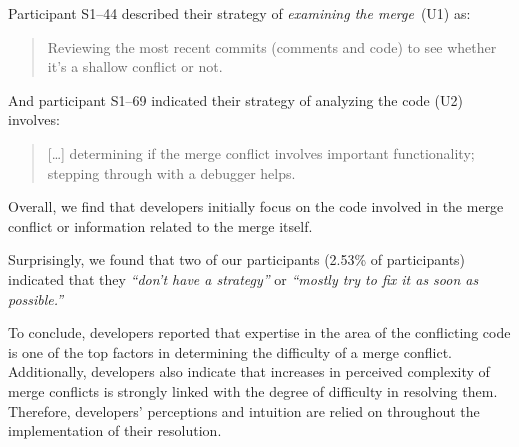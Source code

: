 Participant S1--44 described their strategy of \textit{examining the merge}~(U1) as:
\begin{quotation}
	Reviewing the most recent commits (comments and code) to see whether it's a shallow conflict or not.
\end{quotation}
	And participant S1--69 indicated their strategy of analyzing the code (U2) involves:
\begin{quotation}
[\ldots] determining if the merge conflict involves important functionality; stepping through with a debugger helps.
\end{quotation}
Overall, we find that developers initially focus on the code involved in the merge conflict or information related to the merge itself.

Surprisingly, we found that two of our participants (2.53\% of participants) indicated that they \textit{``don't have a strategy''} or \textit{``mostly try to fix it as soon as possible.''}


To conclude, developers reported that expertise in the area of the conflicting code is one of the top factors in determining the difficulty of a merge conflict.
Additionally, developers also indicate that increases in perceived complexity of merge conflicts is strongly linked with the degree of difficulty in resolving them.
Therefore, developers' perceptions and intuition are relied on throughout the implementation of their resolution.